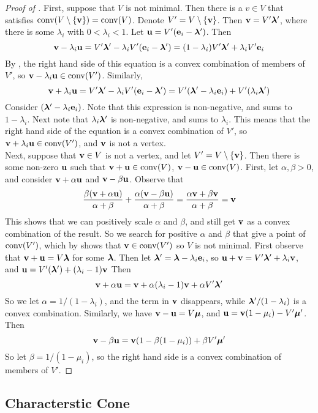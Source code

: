 \begin{proof}[Proof of ]
	First, suppose that $V$ is not minimal.  Then there is a $v\in V$ that satisfies $\operatorname{conv}(V\setminus\left\{\mathbf{v}\right\}) = \operatorname{conv}(V)$.  Denote $V'=V\setminus\left\{\mathbf{v}\right\}$.  Then $\mathbf{v}=V'\bm{\lambda}'$, where there is some $\lambda_i$ with $0 < \lambda_i < 1$.  Let $\mathbf{u} = V'(\mathbf{e}_i-\bm{\lambda}')$.  Then
	\[ \mathbf{v}-\lambda_i\mathbf{u} = V'\bm{\lambda}' - \lambda_iV'(\mathbf{e}_i-\bm{\lambda}')
		= (1-\lambda_i)V'\bm{\lambda}' + \lambda_iV'\mathbf{e}_i\]
	By , the right hand side of this equation is a convex combination of members of $V'$, so $\mathbf{v}-\lambda_i\mathbf{u} \in \operatorname{conv}(V')$.   Similarly,
	\[ \mathbf{v}+\lambda_i\mathbf{u} = V'\bm{\lambda}' - \lambda_iV'(\mathbf{e}_i-\bm{\lambda}') = V'(\bm{\lambda}'-\lambda_i\mathbf{e}_i) + V'(\lambda_i\bm{\lambda}') \]
	Consider $(\bm{\lambda}'-\lambda_i\mathbf{e}_i)$.  Note that this expression is non-negative, and sums to $1-\lambda_i$.  Next note that $\lambda_i\bm{\lambda}'$ is non-negative, and sums to $\lambda_i$.  This means that the right hand side of the equation is a convex combination of $V'$, so $\mathbf{v}+\lambda_i\mathbf{u}\in\operatorname{conv}(V')$, and $\mathbf{v}$ is not a vertex.\\
	Next, suppose that $\mathbf{v}\in V$ is not a vertex, and let $V'=V\setminus\left\{\mathbf{v}\right\}$.  Then there is some non-zero $\mathbf{u}$ such that $\mathbf{v}+\mathbf{u}\in\operatorname{conv}(V)$, $\mathbf{v}-\mathbf{u}\in\operatorname{conv}(V)$.  First, let $\alpha,\beta > 0$, and consider $\mathbf{v}+\alpha\mathbf{u}$ and $\mathbf{v}-\beta\mathbf{u}$.  Observe that
	\[ \frac{\beta(\mathbf{v}+\alpha\mathbf{u})}{\alpha+\beta} + \frac{\alpha(\mathbf{v}-\beta\mathbf{u})}{\alpha+\beta} =
		\frac{\alpha\mathbf{v}+\beta\mathbf{v}}{\alpha+\beta} = \mathbf{v} \]
	This shows that we can positively scale $\alpha$ and $\beta$, and still get $\mathbf{v}$ as a convex combination of the result.  So we search for positive $\alpha$ and $\beta$ that give a point of $\operatorname{conv}(V')$, which by  shows that $\mathbf{v}\in\operatorname{conv}(V')$ so $V$ is not minimal.  First observe that $\mathbf{v}+\mathbf{u} = V\bm{\lambda}$ for some $\bm{\lambda}$.  Then let $\bm{\lambda}' = \bm{\lambda} - \lambda_i\mathbf{e}_i$, so $\mathbf{u}+\mathbf{v} = V'\bm{\lambda}' + \lambda_i\mathbf{v}$, and $\mathbf{u} = V'(\bm{\lambda}') + (\lambda_i-1)\mathbf{v}$  Then
	\[ \mathbf{v} + \alpha\mathbf{u} = \mathbf{v} + \alpha(\lambda_i-1)\mathbf{v} + \alpha V'\bm{\lambda}' \]
	So we let $\alpha = 1/(1-\lambda_i)$, and the term in $\mathbf{v}$ disappears, while $\bm{\lambda}'/(1-\lambda_i)$ is a convex combination.  Similarly, we have $\mathbf{v}-\mathbf{u} = V\bm{\mu}$, and $\mathbf{u} = \mathbf{v}(1-\mu_i)-V'\bm{\mu}'$.  Then
	\[\mathbf{v} - \beta\mathbf{u} = \mathbf{v}(1-\beta(1-\mu_i)) + \beta V'\bm{\mu}' \]
	So let $\beta = 1/(1-\mu_i)$, so the right hand side is a convex combination of members of $V'$.
\end{proof}

\subsection{Characterstic Cone}

